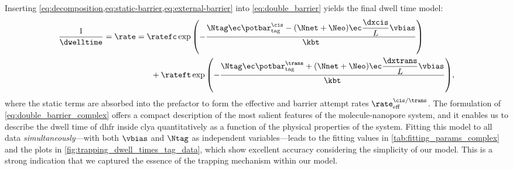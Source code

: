 Inserting \cref{eq:decomposition,eq:static-barrier,eq:external-barrier} into \cref{eq:double_barrier} yields
the final dwell time model:
%
\begin{equation}\label{eq:double_barrier_complex}
	\begin{split}
    \frac{1}{\dwelltime} = \rate ={}&
	\ratefc \exp{%
		\left(
			-\dfrac{%
				\Ntag \ec \potbar_{\rm{tag}}^{\cis}
				- (\Nnet + \Neo) \ec \dfrac{\dxcis}{L} \vbias}{\kbt}
		\right)
		} \\
	&\enspace +
	\rateft \exp{%
		\left(
			-\dfrac{%
				\Ntag \ec \potbar_{\rm{tag}}^{\trans}
				+ (\Nnet + \Neo) \ec \dfrac{\dxtrans}{L} \vbias}{\kbt}
		\right)
		},
	\end{split}
\end{equation}
%
where the static terms are absorbed into the prefactor to form the effective \cisi{} and \transi{} barrier
attempt rates $\rate_{\rm{eff}}^{\cis/\trans}$. The formulation of \cref{eq:double_barrier_complex} offers a
compact description of the most salient features of the molecule-nanopore system, and it enables us to
describe the dwell time of \gls{dhfr} inside \gls{clya} quantitatively as a function of the physical
properties of the system. Fitting this model to all  data \emph{simultaneously}---with both
$\vbias$ and $\Ntag$ as independent variables---leads to the fitting values in
\cref{tab:fitting_params_complex} and the plots in \cref{fig:trapping_dwell_times_tag_data}, which show
excellent accuracy considering the simplicity of our model. This is a strong indication that we captured the
essence of the trapping mechanism within our model.


